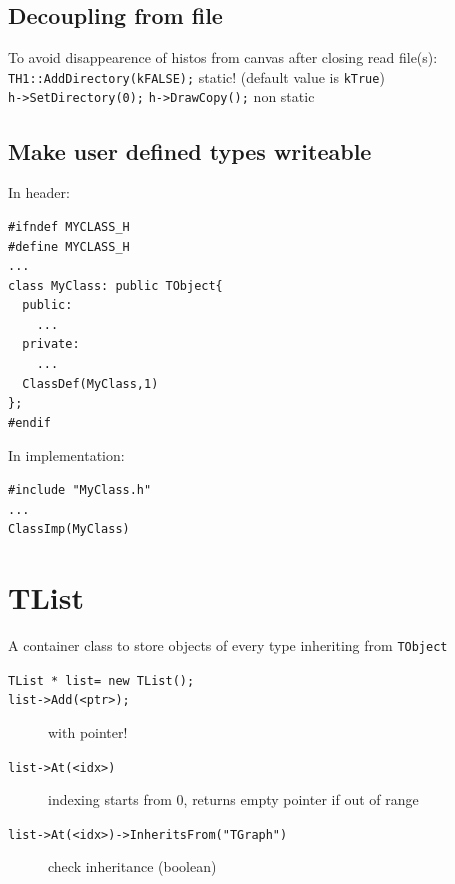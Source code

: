 \documentclass[10pt, twoside]{article}
\newcommand{\ttt}[1]{\colorbox{boxgray}{\texttt{#1}}}
\begin{document}
\subsection{Decoupling from file}
To avoid disappearence of histos from canvas after closing read file(s):
\\\ttt{TH1::AddDirectory(kFALSE);} static! (default value is \texttt{kTrue})
\\\ttt{h->SetDirectory(0);} \ttt{h->DrawCopy();} non static

\subsection{Make user defined types writeable}
In header:
\begin{verbatim}
#ifndef MYCLASS_H 
#define MYCLASS_H
...
class MyClass: public TObject{
  public:
    ...
  private:
    ...
  ClassDef(MyClass,1)
};
#endif
\end{verbatim}
In implementation:
\begin{verbatim}
#include "MyClass.h"
...
ClassImp(MyClass)
\end{verbatim}

\section{TList}
A container class to store objects of every type inheriting from \texttt{TObject}

\begin{description}
\item[\ttt{TList * list= new TList();}]

\item[\ttt{list->Add(<ptr>);}] with pointer!

\item[\ttt{list->At(<idx>)}] indexing starts from 0, returns empty pointer if out of range

\item[\ttt{list->At(<idx>)->InheritsFrom("TGraph")}] check inheritance (boolean)
\end{description}
\end{document}
